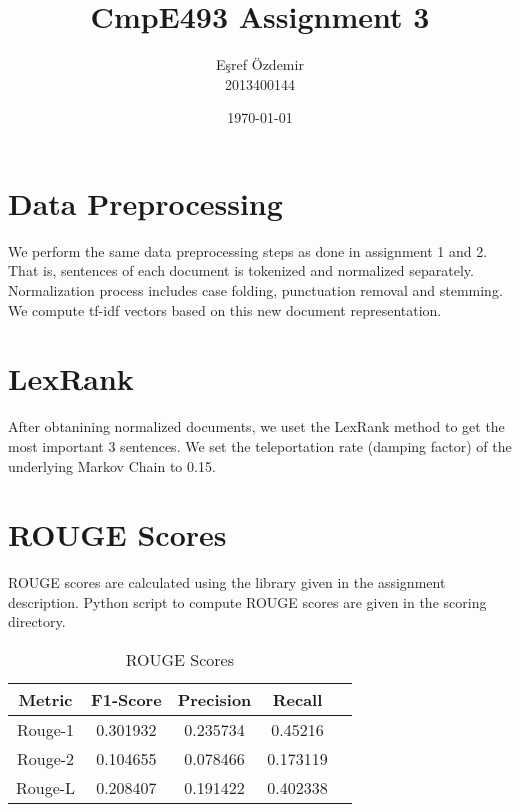 \documentclass{article}
\title{CmpE493 Assignment 3}
\author{Eşref Özdemir\\2013400144}
\date{\today}
\begin{document}
\maketitle
\tableofcontents
\newpage

\section{Data Preprocessing}
We perform the same data preprocessing steps as done in assignment 1 and 2. That
is, sentences of each document is tokenized and normalized separately. Normalization
process includes case folding, punctuation removal and stemming. We compute
tf-idf vectors based on this new document representation.

\section{LexRank}
After obtanining normalized documents, we uset the LexRank method to get the
most important 3 sentences. We set the teleportation rate (damping factor) of
the underlying Markov Chain to 0.15.

\section{ROUGE Scores}
ROUGE scores are calculated using the library given in the assignment
description. Python script to compute ROUGE scores are given in the scoring
directory.

\begin{table}[H]
	\caption{ROUGE Scores}
	\centering
	\begin{tabular}{|c|c|c|c|c|}
		\hline
		\textbf{Metric} & \textbf{F1-Score} & \textbf{Precision} & \textbf{Recall} \\
		\hline
		Rouge-1 & 0.301932 & 0.235734 & 0.45216 \\
		\hline
		Rouge-2 & 0.104655 & 0.078466 & 0.173119 \\
	 	\hline
		Rouge-L & 0.208407 & 0.191422 & 0.402338 \\
		\hline
	\end{tabular}
\end{table}
\end{document}
